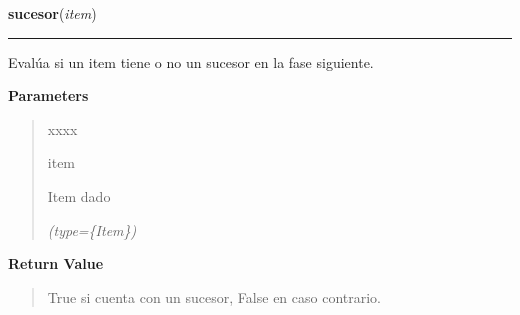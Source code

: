 \hspace{.8\funcindent}\begin{boxedminipage}{\funcwidth}

    \raggedright \textbf{sucesor}(\textit{item})

    \vspace{-1.5ex}

    \rule{\textwidth}{0.5\fboxrule}
\setlength{\parskip}{2ex}
    Evalúa si un item tiene o no un sucesor en la fase siguiente.

\setlength{\parskip}{1ex}
      \textbf{Parameters}
      \vspace{-1ex}

      \begin{quote}
        \begin{Ventry}{xxxx}

          \item[item]

          Item dado

            {\it (type=\{Item\})}

        \end{Ventry}

      \end{quote}

      \textbf{Return Value}
    \vspace{-1ex}

      \begin{quote}
      True si cuenta con un sucesor, False en caso contrario.

      \end{quote}

    \end{boxedminipage}

    \label{saip:lib:func:consistencia_lb}

    \vspace{0.5ex}

